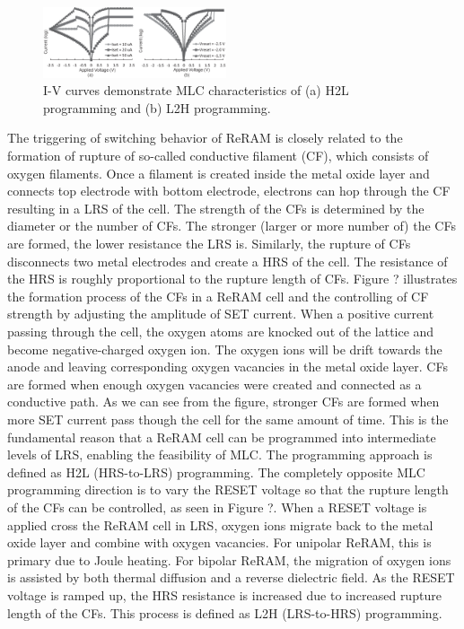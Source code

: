 \begin{figure}[t]
\centering
\includegraphics[width=0.48\textwidth]{fig/i-v}
\vspace{-10pt}
\caption{I-V curves demonstrate MLC characteristics of (a) H2L programming and (b) L2H programming.}
\label{fig:memristor}
\vspace{-15pt}
\end{figure}

The triggering of switching behavior of ReRAM is closely related to the formation of rupture of so-called conductive filament (CF), which consists of oxygen filaments. Once a filament is created inside the metal oxide layer and connects top electrode with bottom electrode, electrons can hop through the CF resulting in a LRS of the cell. The strength of the CFs is determined by the diameter or the number of CFs. The stronger (larger or more number of) the CFs are formed, the lower resistance the LRS is. Similarly, the rupture of CFs disconnects two metal electrodes and create a HRS of the cell. The resistance of the HRS is roughly proportional to the rupture length of CFs. Figure ? illustrates the formation process of the CFs in a ReRAM cell and the controlling of CF strength by adjusting the amplitude of SET current. When a positive current passing through the cell, the oxygen atoms are knocked out of the lattice and become negative-charged oxygen ion. The oxygen ions will be drift towards the anode and leaving corresponding oxygen vacancies in the metal oxide layer. CFs are formed when enough oxygen vacancies were created and connected as a conductive path. As we can see from the figure, stronger CFs are formed when more SET current pass though the cell for the same amount of time. This is the fundamental reason that a ReRAM cell can be programmed into intermediate levels of LRS, enabling the feasibility of MLC. The programming approach is defined as H2L (HRS-to-LRS) programming. The completely opposite MLC programming direction is to vary the RESET voltage so that the rupture length of the CFs can be controlled, as seen in Figure ?. When a RESET voltage is applied cross the ReRAM cell in LRS, oxygen ions migrate back to the metal oxide layer and combine with oxygen vacancies. For unipolar ReRAM, this is primary due to Joule heating. For bipolar ReRAM, the migration of oxygen ions is assisted by both thermal diffusion and a reverse dielectric field. As the RESET voltage is ramped up, the HRS resistance is increased due to increased rupture length of the CFs. This process is defined as L2H (LRS-to-HRS) programming.

